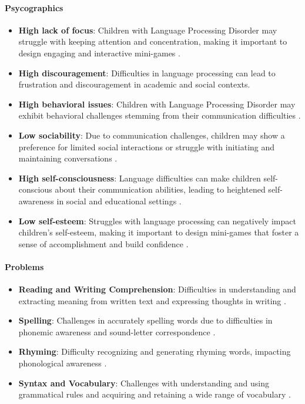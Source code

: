 \paragraph{Psycographics}
\begin{itemize}
    \item \textbf{High lack of focus}: Children with Language Processing Disorder may struggle with keeping attention and concentration, making it important to design engaging and interactive mini-games \cite{vanderbilt}.
    \item \textbf{High discouragement}: Difficulties in language processing can lead to frustration and discouragement in academic and social contexts.
    \item \textbf{High behavioral issues}: Children with Language Processing Disorder may exhibit behavioral challenges stemming from their communication difficulties \cite{vanderbilt}.
    \item \textbf{Low sociability}: Due to communication challenges, children may show a preference for limited social interactions or struggle with initiating and maintaining conversations \cite{greatspeech}.
    \item \textbf{High self-consciousness}: Language difficulties can make children self-conscious about their communication abilities, leading to heightened self-awareness in social and educational settings \cite{additude}.
    \item \textbf{Low self-esteem}: Struggles with language processing can negatively impact children's self-esteem, making it important to design mini-games that foster a sense of accomplishment and build confidence \cite{vanderbilt}.
\end{itemize}

\paragraph{Problems}
\begin{itemize}
    \item \textbf{Reading and Writing Comprehension}: Difficulties in understanding and extracting meaning from written text and expressing thoughts in writing \cite{vanderbilt}.
    \item \textbf{Spelling}: Challenges in accurately spelling words due to difficulties in phonemic awareness and sound-letter correspondence \cite{vanderbilt}.
    \item \textbf{Rhyming}: Difficulty recognizing and generating rhyming words, impacting phonological awareness \cite{vanderbilt}.
    \item \textbf{Syntax and Vocabulary}: Challenges with understanding and using grammatical rules and acquiring and retaining a wide range of vocabulary \cite{additude}.
\end{itemize}

